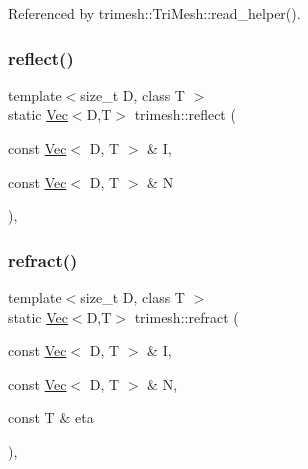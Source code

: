 Referenced by trimesh\+::\+Tri\+Mesh\+::read\+\_\+helper().

\mbox{\label{namespacetrimesh_a796f7912ace3eb4d8302f87fa64de391}} 
\subsubsection{\texorpdfstring{reflect()}{reflect()}}
{\footnotesize\ttfamily template$<$size\+\_\+t D, class T $>$ \\
static \hyperlink{classtrimesh_1_1Vec}{Vec}$<$D,T$>$ trimesh\+::reflect (\begin{DoxyParamCaption}\item[{const \hyperlink{classtrimesh_1_1Vec}{Vec}$<$ D, T $>$ \&}]{I,  }\item[{const \hyperlink{classtrimesh_1_1Vec}{Vec}$<$ D, T $>$ \&}]{N }\end{DoxyParamCaption})\hspace{0.3cm}{\ttfamily [inline]}, {\ttfamily [static]}}

\mbox{\label{namespacetrimesh_a14ff2a88c7132b9a6a114843d41ca221}} 
\subsubsection{\texorpdfstring{refract()}{refract()}}
{\footnotesize\ttfamily template$<$size\+\_\+t D, class T $>$ \\
static \hyperlink{classtrimesh_1_1Vec}{Vec}$<$D,T$>$ trimesh\+::refract (\begin{DoxyParamCaption}\item[{const \hyperlink{classtrimesh_1_1Vec}{Vec}$<$ D, T $>$ \&}]{I,  }\item[{const \hyperlink{classtrimesh_1_1Vec}{Vec}$<$ D, T $>$ \&}]{N,  }\item[{const T \&}]{eta }\end{DoxyParamCaption})\hspace{0.3cm}{\ttfamily [inline]}, {\ttfamily [static]}}

\mbox{\label{namespacetrimesh_a29dccece938acddbc2a3e29ae1c59ab3}} 
